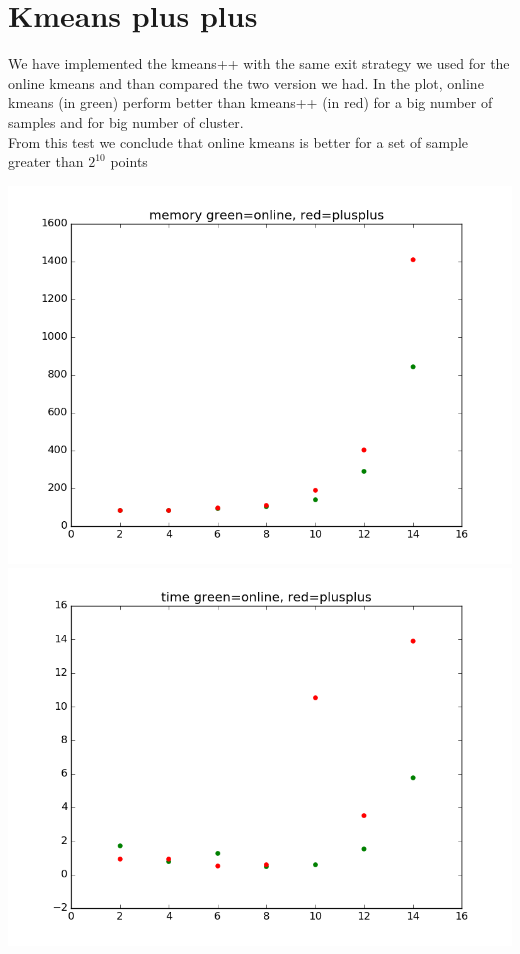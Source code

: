 \documentclass[12pt]{article}
\begin{document}
  
  
\section{Kmeans plus plus}
We have implemented the kmeans++ with the same exit strategy we used for the online kmeans and than compared the two version we had. In the plot, online kmeans (in green) perform better than kmeans++ (in red) for a big number of samples and for big number of cluster. \\
From this test we conclude that online kmeans is better for a set of sample greater than $2^{10}$ points

  
  
\begin{table}
\includegraphics[scale=0.4]{memoryComparison.png}
\includegraphics[scale=0.4]{timeComparison.png}
  \end{table}



  
\end{document}
